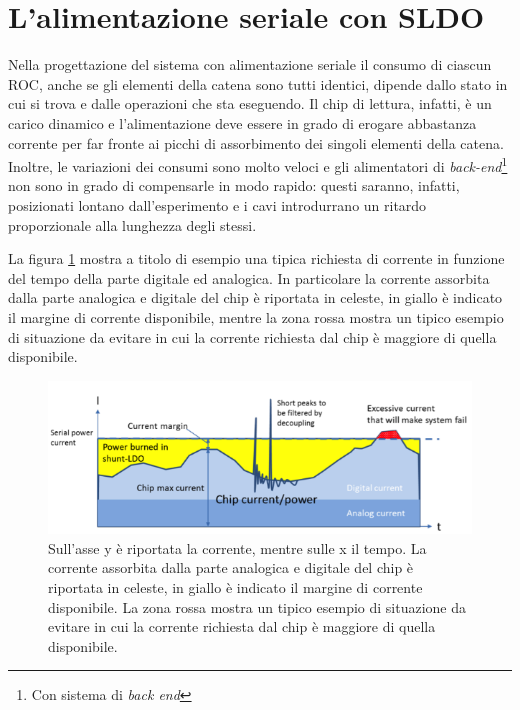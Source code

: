 \section{L'alimentazione seriale con SLDO}

Nella progettazione del sistema con alimentazione seriale il consumo di ciascun ROC, anche se gli elementi della catena sono tutti identici, dipende dallo stato in cui si trova e dalle operazioni che sta eseguendo. 
Il chip di lettura, infatti, è un carico dinamico e l'alimentazione deve essere in grado di erogare abbastanza corrente per far fronte ai picchi di assorbimento dei singoli elementi della catena.
Inoltre, le variazioni dei consumi sono molto veloci e gli alimentatori di \textit{back-end}\footnote{Con sistema di \textit{back end}} non sono in grado di compensarle in modo rapido: questi saranno, infatti, posizionati lontano dall'esperimento e i cavi introdurrano un ritardo proporzionale alla lunghezza degli stessi.

La figura \ref{SLDOprinciple} mostra a titolo di esempio una tipica richiesta di corrente in funzione del tempo della parte digitale ed analogica.
In particolare la corrente assorbita dalla parte analogica e digitale del chip è riportata in celeste, in giallo è indicato il margine di corrente disponibile, mentre la zona rossa mostra un tipico esempio di situazione da evitare in cui la corrente richiesta dal chip è maggiore di quella disponibile.
\begin{figure}[!htbp]
\centering
\includegraphics[scale=.5]{Immagini/ShuntRegulatorPrinciple}
\caption{Sull'asse y è riportata la corrente, mentre sulle x il tempo. La corrente assorbita dalla parte analogica e digitale del chip è riportata in celeste, in giallo è indicato il margine di corrente disponibile. La zona rossa mostra un tipico esempio di situazione da evitare in cui la corrente richiesta dal chip è maggiore di quella disponibile.}
\label{SLDOprinciple}
\end{figure}





